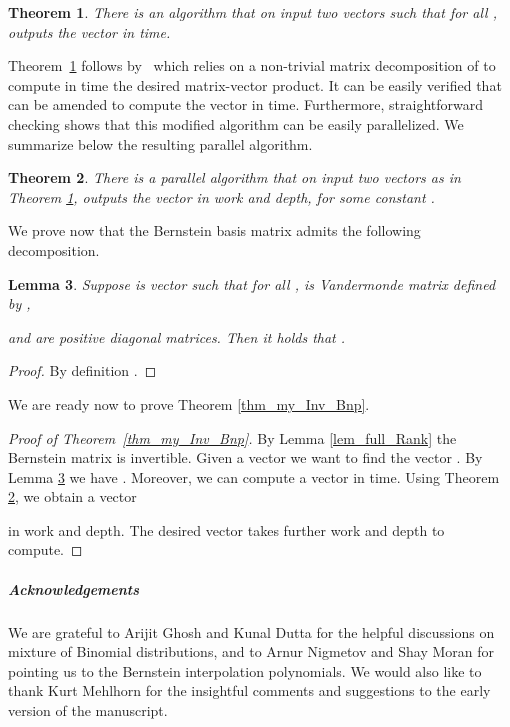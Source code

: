 \documentclass[11pt]{article}
\newtheorem{thm}{Theorem}  \newtheorem{fact}[thm]{Fact}
\newtheorem{lem}[thm]{Lemma}
\numberwithin{thm}{section}
\begin{document}
\begin{thm}\cite{GO94}\label{thm_inv_VT}
There is an algorithm that on input two vectors
 such that  for all
, outputs the vector  in  time.
\end{thm}

Theorem~\ref{thm_inv_VT} follows by~\cite[Algorithm 2.1]{GO94} which relies on a non-trivial matrix decomposition of  to compute in  time the desired  matrix-vector product. It can be easily verified that~\cite[Algorithm 2.1]{GO94} can be amended to compute the vector  in  time. Furthermore, straightforward checking shows that this modified algorithm can be easily parallelized. We summarize below the resulting parallel algorithm.


\begin{thm}\cite{GO94}\label{thm_inv_pl_VT}
There is a parallel algorithm that on input two vectors  as in Theorem \ref{thm_inv_VT}, outputs the vector  in  work and  depth, for some constant .
\end{thm}

We prove now that the Bernstein basis matrix  admits the following decomposition.

\begin{lem}
\label{lem_BB_DVpD} Suppose  is vector
such that  for all , 
is Vandermonde matrix defined by ,

and 
are positive diagonal matrices. Then it holds that .\end{lem}
\begin{proof}
By definition .
\end{proof}

We are ready now to prove Theorem \ref{thm_my_Inv_Bnp}.

\begin{proof}[Proof of Theorem~\ref{thm_my_Inv_Bnp}] By Lemma \ref{lem_full_Rank} the Bernstein matrix  is invertible. Given a vector
 we want to find the vector .
By Lemma \ref{lem_BB_DVpD} we have . Moreover, we can compute a vector 
in  time. Using Theorem \ref{thm_inv_pl_VT}, we obtain a vector
 
in  work and  depth. The desired vector 
takes further  work and  depth to compute.
\end{proof}


\subparagraph*{Acknowledgements}

We are grateful to Arijit Ghosh and Kunal Dutta for the helpful discussions on mixture of Binomial distributions, and to Arnur Nigmetov and Shay Moran for pointing us to the Bernstein interpolation polynomials. We would also like to thank Kurt Mehlhorn for the insightful comments and suggestions to the early version of the manuscript.
\end{document}
